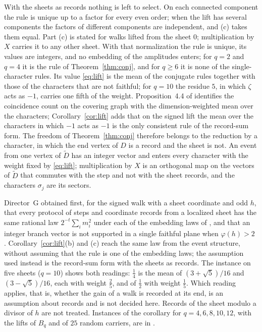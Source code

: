 With the sheets as records nothing is left to select. On each connected component the rule is unique up to a factor for every even order; when the lift has several components the factors of different components are independent, and (c) takes them equal. Part (c) is stated for walks lifted from the sheet $0$; multiplication by $X$ carries it to any other sheet. With that normalization the rule is unique, its values are integers, and no embedding of the amplitudes enters; for $q=2$ and $q=4$ it is the rule of Theorem~\ref{thm:conj}, and for $q\ge6$ it is none of the single-character rules. Its value \eqref{eq:lift} is the mean of the conjugate rules together with those of the characters that are not faithful; for $q=10$ the residue $5$, in which $\zeta$ acts as $-1$, carries one fifth of the weight. Proposition~4.4 of \cite{g8} identifies the coincidence count on the covering graph with the dimension-weighted mean over the characters; Corollary~\ref{cor:lift} adds that on the signed lift the mean over the characters in which $-1$ acts as $-1$ is the only consistent rule of the record-sum form. The freedom of Theorem~\ref{thm:conj} therefore belongs to the reduction by a character, in which the end vertex of $D$ is a record and the sheet is not. An event from one vertex of $\tilde D$ has an integer vector and enters every character with the weight fixed by \eqref{eq:lift}; multiplication by $X$ is an orthogonal map on the vectors of $\tilde D$ that commutes with the step and not with the sheet records, and the characters $\sigma_j$ are its sectors.

Director~G obtained first, for the signed walk with a sheet coordinate and odd $h$, that every protocol of steps and coordinate records from a localized sheet has the same rational law $2^{-t}\sum_im_i^2$ under each of the embedding laws of \cite{dg}, and that an integer branch vector is not supported in a single faithful plane when $\varphi(h)>2$ \cite{dgn}. Corollary~\ref{cor:lift}(b) and (c) reach the same law from the event structure, without assuming that the rule is one of the embedding laws; the assumption used instead is the record-sum form with the sheets as records. The instance on five sheets ($q=10$) shows both readings: $\tfrac14$ is the mean of $(3+\sqrt5)/16$ and $(3-\sqrt5)/16$, each with weight $\tfrac25$, and of $\tfrac12$ with weight $\tfrac15$. Which reading applies, that is, whether the gain of a walk is recorded at its end, is an assumption about records and is not decided here. Records of the sheet modulo a divisor of $h$ are not treated. Instances of the corollary for $q=4,6,8,10,12$, with the lifts of $B_q$ and of $25$ random carriers, are in \cite{comp4s}.

